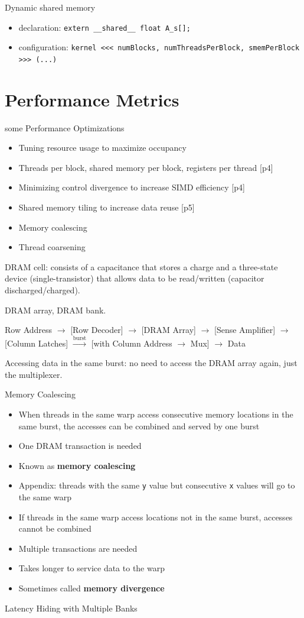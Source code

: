 \documentclass{article}
\begin{document}
Dynamic shared memory

\begin{itemize}
\item declaration: \texttt{extern \_\_shared\_\_ float A\_s[];}
\item configuration: \texttt{kernel <<< numBlocks, numThreadsPerBlock, smemPerBlock >>> (...)}
\end{itemize}

\newpage
\section{Performance Metrics}
some Performance Optimizations


\begin{itemize}
\item Tuning resource usage to maximize occupancy
\item Threads per block, shared memory per block, registers per thread [p4]
\item Minimizing control divergence to increase SIMD efficiency [p4]
\item Shared memory tiling to increase data reuse [p5]
\item Memory coalescing
\item Thread coarsening

\end{itemize}
DRAM cell: consists of a capacitance that stores a charge and a three-state device (single-transistor) that allows data to be read/written (capacitor discharged/charged).


DRAM array, DRAM bank.


Row Address $\to$ [Row Decoder] $\to$ [DRAM Array] $\to$ [Sense Amplifier] $\to$ [Column Latches] $\xrightarrow{\text{burst}}$ [with Column Address $\to$ Mux] $\to$ Data


Accessing data in the same burst: no need to access the DRAM array again, just the multiplexer.


Memory Coalescing

\begin{itemize}
\item When threads in the same warp access consecutive memory locations in the same burst, the accesses can be combined and served by one burst
\item One DRAM transaction is needed
\item Known as \textbf{memory coalescing}
\item Appendix: threads with the same \texttt{y} value but consecutive \texttt{x} values will go to the same warp
\item If threads in the same warp access locations not in the same burst, accesses cannot be combined
\item Multiple transactions are needed
\item Takes longer to service data to the warp
\item Sometimes called \textbf{memory divergence}

\end{itemize}
Latency Hiding with Multiple Banks
\end{document}
